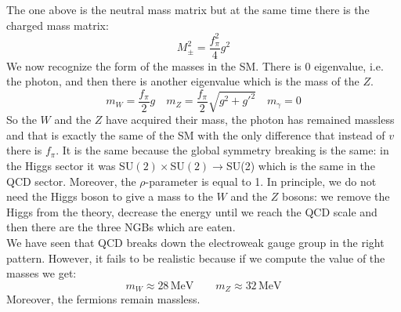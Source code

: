 \documentclass[../main.tex]{subfiles}
\begin{document}
The one above is the neutral mass matrix but at the same time there is the charged mass matrix:
\[
M_\pm^2=\frac{f_\pi^2}{4}g^2
\]
We now recognize the form of the masses in the SM. There is 0 eigenvalue, i.e. the photon, and then there is another eigenvalue which is the mass of the $Z$.
\[
m_W=\frac{f_\pi}{2}g \quad m_Z=\frac{f_\pi}{2}\sqrt{g^2+g'^2} \quad m_\gamma=0
\]
So the $W$ and the $Z$ have acquired their mass, the photon has remained massless and that is exactly the same of the SM with the only difference that instead of $v$ there is $f_\pi$. It is the same because the global symmetry breaking is the same: in the Higgs sector it was SU$(2)\times$SU$(2)\to$SU(2) which is the same in the QCD sector. Moreover, the $\rho$-parameter is equal to 1. In principle, we do not need the Higgs boson to give a mass to the $W$ and the $Z$ bosons: we remove the Higgs from the theory, decrease the energy until we reach the QCD scale and then there are the three NGBs which are eaten.\\
We have seen that QCD breaks down the electroweak gauge group in the right pattern. However, it fails to be realistic because if we compute the value of the masses we get:
\[
m_W\approx28\,\text{MeV} \qquad m_Z\approx32\,\text{MeV}
\]
Moreover, the fermions remain massless.
\end{document}

